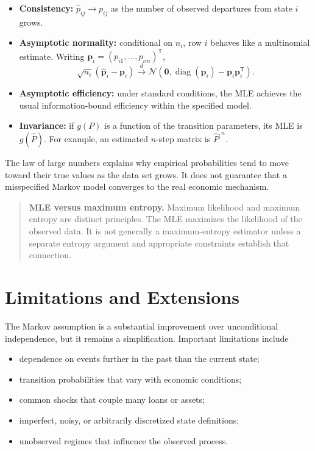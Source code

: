 \documentclass[12pt,openany]{book}
\theoremstyle{definition}
\theoremstyle{remark}
\begin{document}
\begin{itemize}
    \item \textbf{Consistency:} \(\widehat p_{ij}\to p_{ij}\) as the number
    of observed departures from state \(i\) grows.

    \item \textbf{Asymptotic normality:} conditional on \(n_i\), row \(i\)
    behaves like a multinomial estimate. Writing
    \(\boldsymbol{p}_i=(p_{i1},\ldots,p_{im})^{\mathsf T}\),
    \[
    \sqrt{n_i}
    (\widehat{\boldsymbol{p}}_i-\boldsymbol{p}_i)
    \xrightarrow{d}
    \mathcal{N}\!\left(
    \boldsymbol{0},
    \operatorname{diag}(\boldsymbol{p}_i)
    -\boldsymbol{p}_i\boldsymbol{p}_i^{\mathsf T}
    \right).
    \]

    \item \textbf{Asymptotic efficiency:} under standard conditions, the MLE
    achieves the usual information-bound efficiency within the specified
    model.

    \item \textbf{Invariance:} if \(g(P)\) is a function of the transition
    parameters, its MLE is \(g(\widehat P)\). For example, an estimated
    \(n\)-step matrix is \(\widehat P^{,n}\).
\end{itemize}

The law of large numbers explains why empirical probabilities tend to move
toward their true values as the data set grows. It does not guarantee that a
misspecified Markov model converges to the real economic mechanism.

\begin{quote}
\textbf{MLE versus maximum entropy.} Maximum likelihood and maximum entropy
are distinct principles. The MLE maximizes the likelihood of the observed
data. It is not generally a maximum-entropy estimator unless a separate
entropy argument and appropriate constraints establish that connection.
\end{quote}

\section{Limitations and Extensions}

The Markov assumption is a substantial improvement over unconditional
independence, but it remains a simplification. Important limitations include
\begin{itemize}
    \item dependence on events further in the past than the current state;
    \item transition probabilities that vary with economic conditions;
    \item common shocks that couple many loans or assets;
    \item imperfect, noisy, or arbitrarily discretized state definitions;
    \item unobserved regimes that influence the observed process.
\end{itemize}
\end{document}
